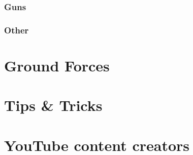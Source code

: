 \documentclass[10pt,a4paper,oneside]{article}
\begin{document}
\section{Guns}








\section{Other}








\newpage
\part{Ground Forces}



























\newpage
\part{Tips \& Tricks}


\newpage
\part{YouTube content creators}

\end{document}
